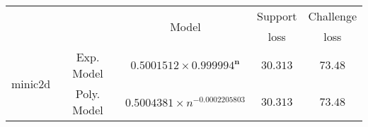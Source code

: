 \begin{tabular}{ccccc} 
\hline 
 &  & \multirow{2}{*}{Model} & Support & Challenge\tabularnewline 
 &  &  & loss  & loss\tabularnewline 
\hline 
\hline 
\multirow{2}{*}{minic2d} & Exp. Model & $\mathbf{0.5001512\times 0.999994^{n}}$ & $\mathbf{30.313}$ & $\mathbf{73.48}$ \tabularnewline 
 & Poly. Model & $0.5004381\times n^{-0.0002205803}$ & $30.313$ & $73.48$ \tabularnewline 
\hline 
\end{tabular} 

